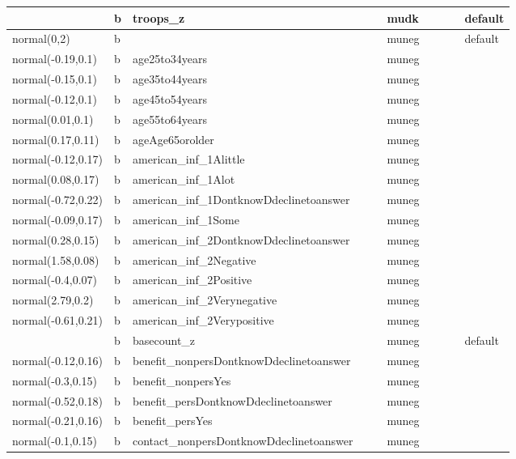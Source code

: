 \documentclass[
]{book}
\theoremstyle{definition}
\theoremstyle{definition}
\theoremstyle{definition}
\theoremstyle{definition}
\theoremstyle{remark}
\begin{document}
\begin{table}
\begin{tabular}[t]{l|l|l|l|l|l|l|l|l|l}
\hline
 & b & troops\_z &  &  & mudk &  &  &  & default\\
\hline
normal(0,2) & b &  &  &  & muneg &  &  &  & default\\
\hline
normal(-0.19,0.1) & b & age25to34years &  &  & muneg &  &  &  & \\
\hline
normal(-0.15,0.1) & b & age35to44years &  &  & muneg &  &  &  & \\
\hline
normal(-0.12,0.1) & b & age45to54years &  &  & muneg &  &  &  & \\
\hline
normal(0.01,0.1) & b & age55to64years &  &  & muneg &  &  &  & \\
\hline
normal(0.17,0.11) & b & ageAge65orolder &  &  & muneg &  &  &  & \\
\hline
normal(-0.12,0.17) & b & american\_inf\_1Alittle &  &  & muneg &  &  &  & \\
\hline
normal(0.08,0.17) & b & american\_inf\_1Alot &  &  & muneg &  &  &  & \\
\hline
normal(-0.72,0.22) & b & american\_inf\_1DontknowDdeclinetoanswer &  &  & muneg &  &  &  & \\
\hline
normal(-0.09,0.17) & b & american\_inf\_1Some &  &  & muneg &  &  &  & \\
\hline
normal(0.28,0.15) & b & american\_inf\_2DontknowDdeclinetoanswer &  &  & muneg &  &  &  & \\
\hline
normal(1.58,0.08) & b & american\_inf\_2Negative &  &  & muneg &  &  &  & \\
\hline
normal(-0.4,0.07) & b & american\_inf\_2Positive &  &  & muneg &  &  &  & \\
\hline
normal(2.79,0.2) & b & american\_inf\_2Verynegative &  &  & muneg &  &  &  & \\
\hline
normal(-0.61,0.21) & b & american\_inf\_2Verypositive &  &  & muneg &  &  &  & \\
\hline
 & b & basecount\_z &  &  & muneg &  &  &  & default\\
\hline
normal(-0.12,0.16) & b & benefit\_nonpersDontknowDdeclinetoanswer &  &  & muneg &  &  &  & \\
\hline
normal(-0.3,0.15) & b & benefit\_nonpersYes &  &  & muneg &  &  &  & \\
\hline
normal(-0.52,0.18) & b & benefit\_persDontknowDdeclinetoanswer &  &  & muneg &  &  &  & \\
\hline
normal(-0.21,0.16) & b & benefit\_persYes &  &  & muneg &  &  &  & \\
\hline
normal(-0.1,0.15) & b & contact\_nonpersDontknowDdeclinetoanswer &  &  & muneg &  &  &  & \\

\end{tabular}
\end{table}
\end{document}
